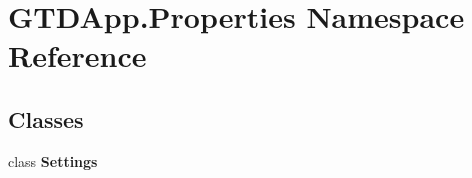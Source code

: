 \hypertarget{namespace_g_t_d_app_1_1_properties}{}\section{G\+T\+D\+App.\+Properties Namespace Reference}
\label{namespace_g_t_d_app_1_1_properties}
\subsection*{Classes}
\begin{DoxyCompactItemize}
\item 
class {\bfseries Settings}
\end{DoxyCompactItemize}
